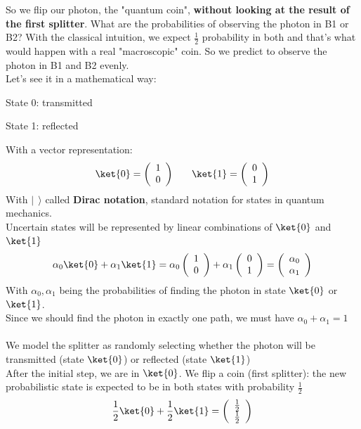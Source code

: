 \documentclass[10pt]{report}
\begin{document}
So we flip our photon, the "quantum coin", \textbf{without looking at the result of the first splitter}. What are the probabilities of observing the photon in B1 or B2? With the classical intuition, we expect $\frac{1}{2}$ probability in both and that's what would happen with a real "macroscopic" coin. So we predict to observe the photon in B1 and B2 evenly.\\
Let's see it in a mathematical way:
\begin{list}{}{}
	\item State 0: transmitted
	\item State 1: reflected
\end{list}
With a vector representation:
$$\ket{0} = \left(\begin{array}{c}
	1\\0
	\end{array}\right)\:\:\:\:\:\:\:\:\ket{1} = \left(\begin{array}{c}
	0\\1
	\end{array}\right)$$
With $|\:\:\rangle$ called \textbf{Dirac notation}, standard notation for states in quantum mechanics.\\
Uncertain states will be represented by linear combinations of $\ket{0}$ and $\ket{1}$
$$\alpha_0\ket{0} + \alpha_1\ket{1} = \alpha_0\left(\begin{array}{c}
1\\0
\end{array}\right) + \alpha_1\left(\begin{array}{c}
0\\1
\end{array}\right) = \left(\begin{array}{c}
\alpha_0\\\alpha_1
\end{array}\right)$$
With $\alpha_0,\alpha_1$ being the probabilities of finding the photon in state $\ket{0}$ or $\ket{1}$.\\
Since we should find the photon in exactly one path, we must have $\alpha_0+\alpha_1=1$\\\\
We model the splitter as randomly selecting whether the photon will be transmitted (state $\ket{0}$) or reflected (state $\ket{1}$)\\
After the initial step, we are in $\ket{0}$. We flip a coin (first splitter): the new probabilistic state is expected to be in both states with probability $\frac{1}{2}$
$$\frac{1}{2}\ket{0} + \frac{1}{2}\ket{1} = \left(\begin{array}{c}
\frac{1}{2}\\\frac{1}{2}
\end{array}\right)$$
\end{document}
